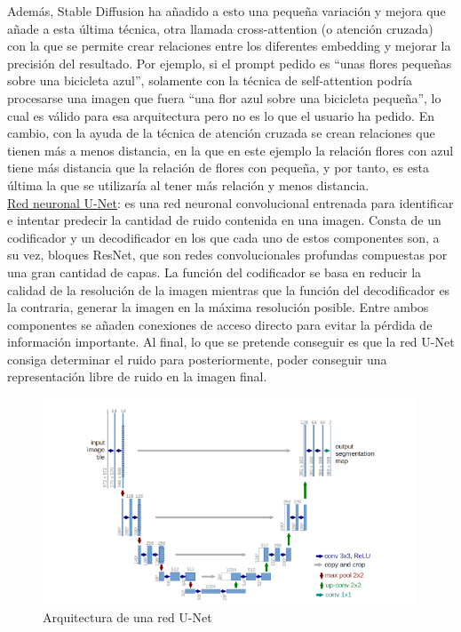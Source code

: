 Además, Stable Diffusion ha añadido a esto una pequeña variación y mejora que añade a esta última técnica, otra llamada cross-attention (o atención cruzada) con la que se permite crear relaciones entre los diferentes embedding y mejorar la precisión del resultado. Por ejemplo, si el prompt pedido es “unas flores pequeñas sobre una bicicleta azul”, solamente con la técnica de self-attention podría procesarse una imagen que fuera “una flor azul sobre una bicicleta pequeña”, lo cual es válido para esa arquitectura pero no es lo que el usuario ha pedido. En cambio, con la ayuda de la técnica de atención cruzada se crean relaciones que tienen más a menos distancia, en la que en este ejemplo la relación flores con azul tiene más distancia que la relación de flores con pequeña, y por tanto, es esta última la que se utilizaría al tener más relación y menos distancia.\\

\underline{Red neuronal U-Net}: es una red neuronal convolucional entrenada para identificar e intentar predecir la cantidad de ruido contenida en una imagen. Consta de un codificador y un decodificador en los que cada uno de estos componentes son, a su vez, bloques ResNet, que son redes convolucionales profundas compuestas por una gran cantidad de capas. La función del codificador se basa en reducir la calidad de la resolución de la imagen mientras que  la función del decodificador es la contraria, generar la imagen en la máxima resolución posible. Entre ambos componentes se añaden conexiones de acceso directo para evitar la pérdida de información importante. Al final, lo que se pretende conseguir es que la red U-Net consiga determinar el ruido para posteriormente, poder conseguir una representación libre de ruido en la imagen final.

\begin{figure}[!htb]
	\centering
	\includegraphics[width = 1
	\textwidth]{Imagenes/Vectorial/u-net.png}
	\caption{Arquitectura de una red U-Net}
	\label{fig:unet}
\end{figure}

